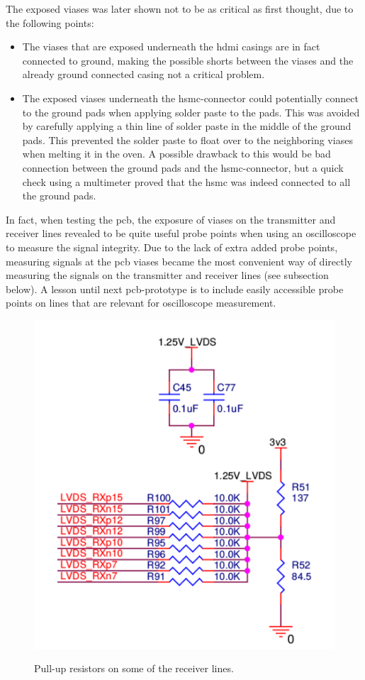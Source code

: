 \documentclass[main.tex]{subfiles}
\begin{document}
The exposed viases was later shown not to be as critical as first thought, due to the following points:\\

\begin{itemize}\setlength{\itemsep}{10pt}
\item The viases that are exposed underneath the \gls{hdmi} casings are in fact connected to ground, making the possible shorts between the viases and the already ground connected casing not a critical problem.
\item The exposed viases underneath the \gls{hsmc}-connector could potentially connect to the ground pads when applying solder paste to the pads. This was avoided by carefully applying  a thin line of solder paste in the middle of the ground pads. This prevented the solder paste to float over to the neighboring viases when melting it in the oven. A possible drawback to this would be bad connection between the ground pads and the \gls{hsmc}-connector, but a quick check using a multimeter proved that the \gls{hsmc} was indeed connected to all the ground pads.\\
\end{itemize}

In fact, when testing the \gls{pcb}, the exposure of viases on the transmitter and receiver lines revealed to be quite useful probe points when using an oscilloscope to measure the signal integrity. Due to the lack of extra added probe points, measuring signals at the \gls{pcb} viases became the most convenient way of directly measuring the signals on the transmitter and receiver lines (see subsection below). A lesson until next \gls{pcb}-prototype is to include easily accessible probe points on lines that are relevant for oscilloscope measurement.\\

\begin{figure}[H] %
\includegraphics[width = 7 cm]{../img/pullups}  \\[0.1 cm]
\caption{Pull-up resistors on some of the receiver lines.}
\label{fig:pullups}
\end{figure}
\end{document}
